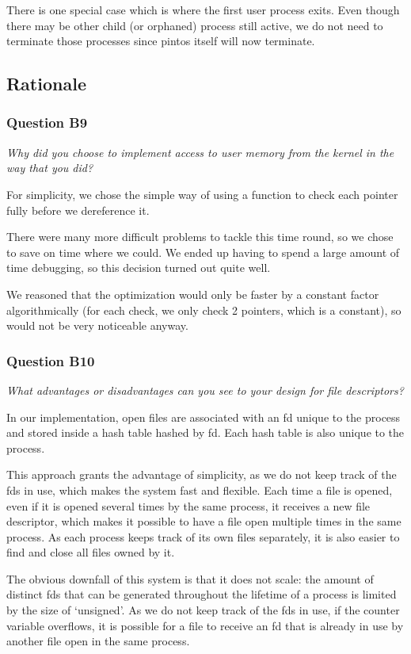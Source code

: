There is one special case which is where the first user process exits. Even though there may be other child (or orphaned) process still active, we do not need to terminate those processes since pintos itself will now terminate.

\subsection{Rationale}

\subsubsection*{Question B9} %
\textit{Why did you choose to implement access to user memory from the kernel in the way that you did?}

For simplicity, we chose the simple way of using a function to check each
pointer fully before we dereference it.

There were many more difficult problems to tackle this time round, so we chose
to save on time where we could. We ended up having to spend a large amount of
time debugging, so this decision turned out quite well.

We reasoned that the optimization would only be faster by a constant factor
algorithmically (for each check, we only check 2 pointers, which is a constant),
so would not be very noticeable anyway.

\subsubsection*{Question B10} %
\textit{What advantages or disadvantages can you see to your design for file descriptors?}

In our implementation, open files are associated with an fd unique to the process and stored inside a hash table hashed by fd. Each hash table is also unique to the process.

This approach grants the advantage of simplicity, as we do not keep track of the fds in use, which makes the system fast and flexible.
Each time a file is opened, even if it is opened several times by the same process, it receives a new file descriptor, which makes it possible to have a file open multiple times in the same process.
As each process keeps track of its own files separately, it is also easier to find and close all files owned by it.

The obvious downfall of this system is that it does not scale: the amount of distinct fds that can be generated throughout the lifetime of a process is limited by the size of `unsigned'. As we do not keep track of the fds in use, if the counter variable overflows, it is possible for a file to receive an fd that is already in use by another file open in the same process.


